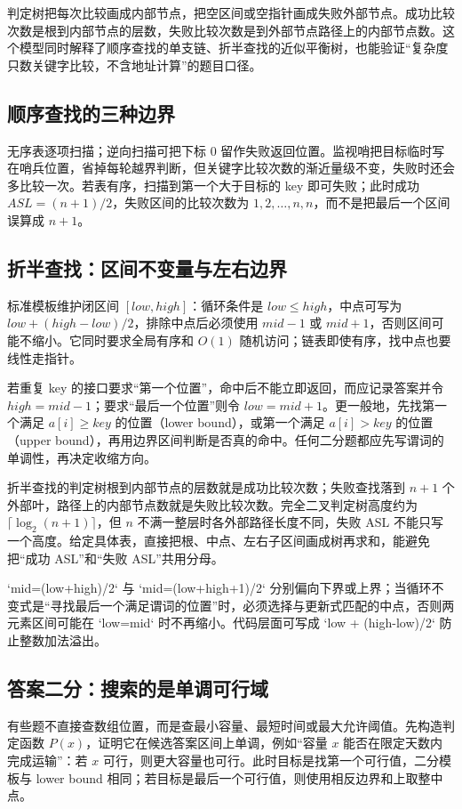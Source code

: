 \documentclass[UTF8,fontset=none,11pt,a4paper]{ctexart}
\begin{document}
判定树把每次比较画成内部节点，把空区间或空指针画成失败外部节点。成功比较次数是根到内部节点的层数，失败比较次数是到外部节点路径上的内部节点数。这个模型同时解释了顺序查找的单支链、折半查找的近似平衡树，也能验证“复杂度只数关键字比较，不含地址计算”的题目口径。

\subsection{顺序查找的三种边界}
无序表逐项扫描；逆向扫描可把下标 $0$ 留作失败返回位置。监视哨把目标临时写在哨兵位置，省掉每轮越界判断，但关键字比较次数的渐近量级不变，失败时还会多比较一次。若表有序，扫描到第一个大于目标的 key 即可失败；此时成功 $ASL=(n+1)/2$，失败区间的比较次数为 $1,2,\ldots,n,n$，而不是把最后一个区间误算成 $n+1$。

\subsection{折半查找：区间不变量与左右边界}
标准模板维护闭区间 $[low,high]$：循环条件是 $low\le high$，中点可写为 $low+(high-low)/2$，排除中点后必须使用 $mid-1$ 或 $mid+1$，否则区间可能不缩小。它同时要求全局有序和 $O(1)$ 随机访问；链表即使有序，找中点也要线性走指针。

若重复 key 的接口要求“第一个位置”，命中后不能立即返回，而应记录答案并令 $high=mid-1$；要求“最后一个位置”则令 $low=mid+1$。更一般地，先找第一个满足 $a[i]\ge key$ 的位置（lower bound），或第一个满足 $a[i]>key$ 的位置（upper bound），再用边界区间判断是否真的命中。任何二分题都应先写谓词的单调性，再决定收缩方向。

折半查找的判定树根到内部节点的层数就是成功比较次数；失败查找落到 $n+1$ 个外部叶，路径上的内部节点数就是失败比较次数。完全二叉判定树高度约为 $\lceil\log_2(n+1)\rceil$，但 $n$ 不满一整层时各外部路径长度不同，失败 ASL 不能只写一个高度。给定具体表，直接把根、中点、左右子区间画成树再求和，能避免把“成功 ASL”和“失败 ASL”共用分母。

`mid=(low+high)/2` 与 `mid=(low+high+1)/2` 分别偏向下界或上界；当循环不变式是“寻找最后一个满足谓词的位置”时，必须选择与更新式匹配的中点，否则两元素区间可能在 `low=mid` 时不再缩小。代码层面可写成 `low + (high-low)/2` 防止整数加法溢出。

\subsection{答案二分：搜索的是单调可行域}
有些题不直接查数组位置，而是查最小容量、最短时间或最大允许阈值。先构造判定函数 $P(x)$，证明它在候选答案区间上单调，例如“容量 $x$ 能否在限定天数内完成运输”：若 $x$ 可行，则更大容量也可行。此时目标是找第一个可行值，二分模板与 lower bound 相同；若目标是最后一个可行值，则使用相反边界和上取整中点。
\end{document}
